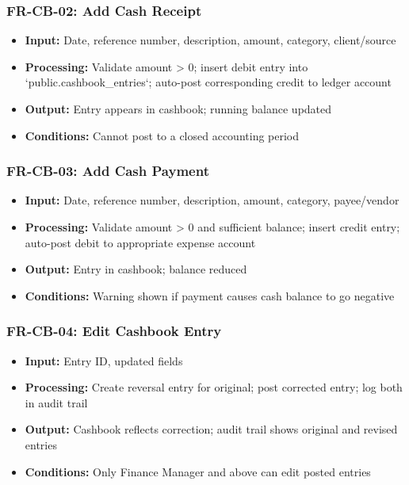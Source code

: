 \documentclass[journal, a4paper, onecolumn, 12pt]{IEEEtran}
\begin{document}
\subsubsection{FR-CB-02: Add Cash Receipt}
\begin{itemize}[leftmargin=*]
\item \textbf{Input:} Date, reference number, description, amount, category, client/source
\item \textbf{Processing:} Validate amount > 0; insert debit entry into `public.cashbook\_entries`; auto-post corresponding credit to ledger account
\item \textbf{Output:} Entry appears in cashbook; running balance updated
\item \textbf{Conditions:} Cannot post to a closed accounting period
\end{itemize}

\subsubsection{FR-CB-03: Add Cash Payment}
\begin{itemize}[leftmargin=*]
\item \textbf{Input:} Date, reference number, description, amount, category, payee/vendor
\item \textbf{Processing:} Validate amount > 0 and sufficient balance; insert credit entry; auto-post debit to appropriate expense account
\item \textbf{Output:} Entry in cashbook; balance reduced
\item \textbf{Conditions:} Warning shown if payment causes cash balance to go negative
\end{itemize}

\subsubsection{FR-CB-04: Edit Cashbook Entry}
\begin{itemize}[leftmargin=*]
\item \textbf{Input:} Entry ID, updated fields
\item \textbf{Processing:} Create reversal entry for original; post corrected entry; log both in audit trail
\item \textbf{Output:} Cashbook reflects correction; audit trail shows original and revised entries
\item \textbf{Conditions:} Only Finance Manager and above can edit posted entries
\end{itemize}
\end{document}

